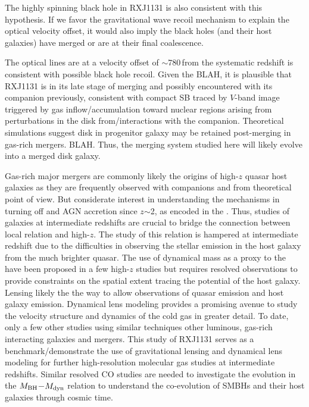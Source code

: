 \documentclass[]{emulateapj}
\begin{document}
The highly spinning black hole in RXJ1131 is also consistent with
this hypothesis.
If we favor the gravitational wave recoil mechanism
to explain the optical velocity offset, it would also imply the black
holes (and their host galaxies) have merged or are at their final coalescence.

The optical lines are at a velocity offset of $\sim$780\,\kms from the systematic redshift is consistent 
with possible black hole recoil. 
Given the BLAH, it is plausible that RXJ1131 is in its late stage of merging and 
possibly encountered with its companion previously, consistent with 
compact SB traced by $V$-band image triggered by gas inflow/accumulation toward nuclear regions 
arising from perturbations in the disk from/interactions with the companion.
Theoretical simulations suggest disk in progenitor galaxy may be retained post-merging in gas-rich 
mergers. BLAH. Thus, the merging system studied here will likely evolve into a merged disk galaxy.

Gas-rich major mergers are commonly likely the origins of high-$z$ quasar host galaxies as
they are frequently observed with companions and from theoretical point of view. But considerate 
interest in understanding the mechanisms in turning off \SF and AGN accretion since $z$$\sim$2, as 
encoded in the \bhrelation. Thus, studies of galaxies at intermediate redshifts are crucial to 
bridge the connection between local relation and high-$z$. 
The study of this relation is hampered at intermediate redshift due to the difficulties in observing the 
stellar emission in the host galaxy from the much brighter quasar. 
The use of dynamical mass as a proxy to the \bhrelation have been proposed in a few high-$z$ studies 
but requires resolved observations to provide constraints on the spatial extent tracing the potential of 
the host galaxy. Lensing likely the the way to allow observations of quasar emission and 
host galaxy emission. Dynamical lens modeling provides a promising avenue to study the velocity 
structure and dynamics of the cold gas in greater detail. 
To date, only a few other studies using similar techniques \eg other luminous,
gas-rich interacting galaxies and mergers.
This study of RXJ1131 serves as a benchmark/demonstrate the use of gravitational lensing and 
dynamical lens modeling for further high-resolution molecular gas studies at 
intermediate redshifts.  Similar resolved CO studies are needed to investigate the evolution in 
the $M_{\rm BH}$$-$$M_{\rm dyn}$ relation to understand the co-evolution of SMBHs and their 
host galaxies through cosmic time.
\end{document}
